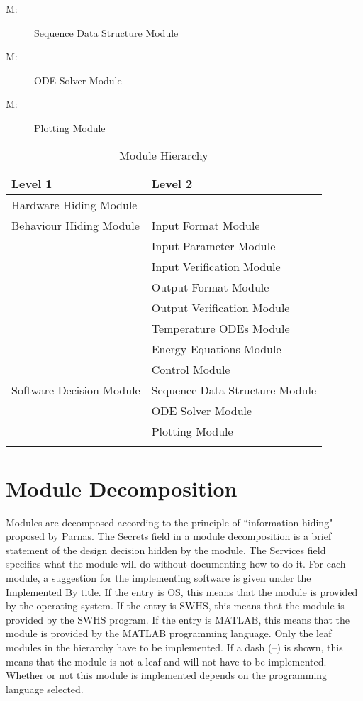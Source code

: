 \documentclass[12pt]{article}
\newcounter{modnum}
\newcommand{\mthemodnum}{M\themodnum}
\begin{document}
\begin{description}
\item[\mthemodnum\label{Mmodseqserv}:]Sequence Data Structure Module
\end{description}
\begin{description}
\item[\mthemodnum\label{Mmododedesc}:]ODE Solver Module
\end{description}
\begin{description}
\item[\mthemodnum\label{Mmodplotdesc}:]Plotting Module
\end{description}
\begin{longtable}{l l}
\toprule
Level 1 & Level 2
\\
\midrule
Hardware Hiding Module & 
\\
Behaviour Hiding Module & Input Format Module
\\
 & Input Parameter Module
\\
 & Input Verification Module
\\
 & Output Format Module
\\
 & Output Verification Module
\\
 & Temperature ODEs Module
\\
 & Energy Equations Module
\\
 & Control Module
\\
Software Decision Module & Sequence Data Structure Module
\\
 & ODE Solver Module
\\
 & Plotting Module
\\
\bottomrule
\caption{Module Hierarchy}
\label{Table:ModuHier}
\end{longtable}
\section{Module Decomposition}
\label{Sec:ModuDeco}
Modules are decomposed according to the principle of ``information hiding" proposed by Parnas. The Secrets field in a module decomposition is a brief statement of the design decision hidden by the module. The Services field specifies what the module will do without documenting how to do it. For each module, a suggestion for the implementing software is given under the Implemented By title. If the entry is OS, this means that the module is provided by the operating system. If the entry is SWHS, this means that the module is provided by the SWHS program. If the entry is MATLAB, this means that the module is provided by the MATLAB programming language. Only the leaf modules in the hierarchy have to be implemented. If a dash (--) is shown, this means that the module is not a leaf and will not have to be implemented. Whether or not this module is implemented depends on the programming language selected.
\end{document}
